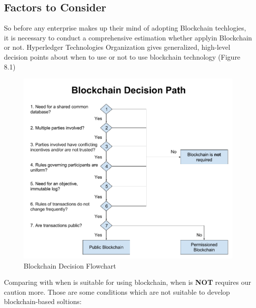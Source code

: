 \subsection{Factors to Consider}
So before any enterprise makes up their mind of adopting Blockchain techlogies, it is necessary to conduct a comprehensive estimation whether applyin Blockchain or not. Hyperledger Technologies Organization gives generalized, high-level decision points about when to use or not to use blockchain technology (Figure 8.1)
\begin{figure}[htb]%
	\includegraphics[width=\textwidth]{charts/Blockchain_Decision_Flowchart}
	\caption{Blockchain Decision Flowchart \cite{decision}}
\end{figure}
Comparing with when is suitable for using blockchain, when is \textbf{NOT} requires our caution more. Those are some conditions which are not suitable to develop blockchain-based soltions:
